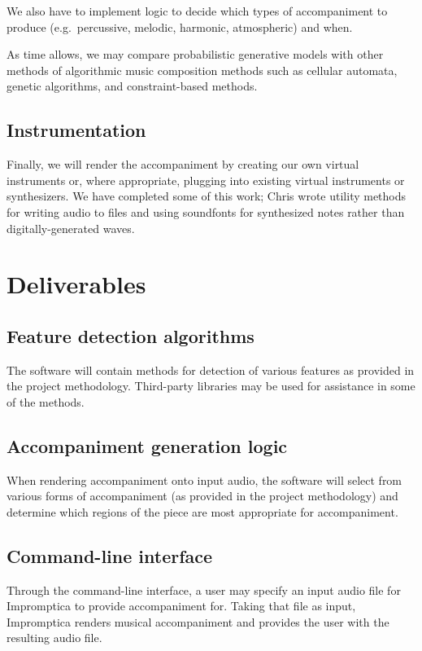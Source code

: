 \documentclass[11pt,conference,letterpaper]{IEEEtran}
\begin{document}
We also have to implement logic to decide which types of accompaniment to produce (e.g.\ percussive, melodic, harmonic, atmospheric) and when.

As time allows, we may compare probabilistic generative models with other methods of algorithmic music composition methods such as cellular automata, genetic algorithms, and constraint-based methods.

\subsection{Instrumentation}

Finally, we will render the accompaniment by creating our own virtual instruments or, where appropriate, plugging into existing virtual instruments or synthesizers. We have completed some of this work; Chris wrote utility methods for writing audio to files and using soundfonts for synthesized notes rather than digitally-generated waves.

\section{Deliverables}

\subsection{Feature detection algorithms}

The software will contain methods for detection of various features as provided in the project methodology. Third-party libraries may be used for assistance in some of the methods.

\subsection{Accompaniment generation logic}

When rendering accompaniment onto input audio, the software will select from various forms of accompaniment (as provided in the project methodology) and determine which regions of the piece are most appropriate for accompaniment.

\subsection{Command-line interface}

Through the command-line interface, a user may specify an input audio file for Impromptica to provide accompaniment for. Taking that file as input, Impromptica renders musical accompaniment and provides the user with the resulting audio file.
\end{document}
